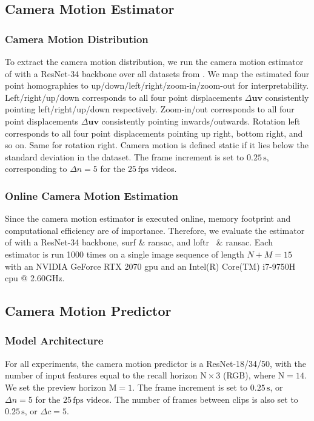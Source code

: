 \subsection{Camera Motion Estimator}
\label{c4:sec:camera_motion_estimator}
\subsubsection{Camera Motion Distribution} 
To extract the camera motion distribution, we run the camera motion estimator of  with a ResNet-34 backbone over all datasets from . We map the estimated four point homographies to up/down/left/right/zoom-in/zoom-out for interpretability. Left/right/up/down corresponds to all four point displacements $\Delta\mathbf{uv}$ consistently pointing left/right/{\allowbreak}up/down respectively.
Zoom-in/out corresponds to all four point displacements $\Delta\mathbf{uv}$ consistently pointing inwards/outwards. Rotation left corresponds to all four point displacements pointing up right, bottom right, and so on. Same for rotation right. Camera motion is defined static if it lies below the standard deviation in the dataset. The frame increment is set to $0.25\,\text{s}$, corresponding to $\Delta n = 5$ for the $25\,\text{fps}$ videos.

\subsubsection{Online Camera Motion Estimation}
\label{c4:sec:online_camera_motion_estimation}
Since the camera motion estimator is executed online, memory footprint and computational efficiency are of importance. Therefore, we evaluate the estimator of  with a ResNet-34 backbone, \gls{surf} \& \gls{ransac}, and \gls{loftr}~\cite{sun2021loftr} \& \gls{ransac}. Each estimator is run 1000 times on a single image sequence of length $N+M=15$ with an NVIDIA GeForce RTX 2070 \gls{gpu} and an Intel(R) Core(TM) i7-9750H \gls{cpu} @ 2.60GHz.

\subsection{Camera Motion Predictor}
\label{c4:sec:camera_motion_predictor_experiments}
\subsubsection{Model Architecture}
\label{c4:sec:model_architecture}
For all experiments, the camera motion predictor is a ResNet-18/34/50, with the number of input features equal to the recall horizon $\text{N}\times3$ (RGB), where $\text{N}=14$. We set the preview horizon $\text{M}=1$. The frame increment is set to $0.25\,\text{s}$, or $\Delta n = 5$ for the $25\,\text{fps}$ videos. The number of frames between clips is also set to $0.25\,\text{s}$, or $\Delta c = 5$.

